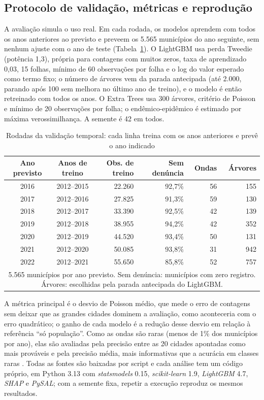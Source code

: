 \documentclass[12pt]{article}
\begin{document}
\subsection{Protocolo de validação, métricas e reprodução}

A avaliação simula o uso real. Em cada rodada, os modelos aprendem com todos os anos anteriores ao previsto e preveem os 5.565 municípios do ano seguinte, sem nenhum ajuste com o ano de teste (Tabela~\ref{tab:rodadas}). O LightGBM usa perda Tweedie (potência 1,3), própria para contagens com muitos zeros, taxa de aprendizado 0,03, 15 folhas, mínimo de 60 observações por folha e o log do valor esperado como termo fixo; o número de árvores vem da parada antecipada (até 2.000, parando após 100 sem melhora no último ano de treino), e o modelo é então retreinado com todos os anos. O Extra Trees usa 300 árvores, critério de Poisson e mínimo de 20 observações por folha; o endêmico-epidêmico é estimado por máxima verossimilhança. A semente é 42 em todos.

\begin{table}[!htb]
\centering
\caption{Rodadas da validação temporal: cada linha treina com os anos anteriores e prevê o ano indicado}
\label{tab:rodadas}
{\renewcommand{\arraystretch}{1.0}\footnotesize
\begin{tabular}{c c r r r r}
\toprule
\textbf{Ano previsto} & \textbf{Anos de treino} & \textbf{Obs. de treino} & \textbf{Sem denúncia} & \textbf{Ondas} & \textbf{Árvores} \\
\midrule
2016 & 2012--2015 & 22.260 & 92,7\% & 56 & 155 \\
2017 & 2012--2016 & 27.825 & 91,3\% & 59 & 130 \\
2018 & 2012--2017 & 33.390 & 92,5\% & 42 & 139 \\
2019 & 2012--2018 & 38.955 & 94,2\% & 42 & 352 \\
2020 & 2012--2019 & 44.520 & 93,4\% & 50 & 131 \\
2021 & 2012--2020 & 50.085 & 93,8\% & 31 & 942 \\
2022 & 2012--2021 & 55.650 & 85,8\% & 52 & 757 \\
\bottomrule
\multicolumn{6}{p{12.5cm}}{\footnotesize 5.565 municípios por ano previsto. Sem denúncia: municípios com zero registro. Árvores: escolhidas pela parada antecipada do LightGBM.}
\end{tabular}}
\end{table}

A métrica principal é o desvio de Poisson médio, que mede o erro de contagens sem deixar que as grandes cidades dominem a avaliação, como aconteceria com o erro quadrático; o ganho de cada modelo é a redução desse desvio em relação à referência ``só população''. Como as ondas são raras (menos de 1\% dos municípios por ano), elas são avaliadas pela precisão entre as 20 cidades apontadas como mais prováveis e pela precisão média, mais informativas que a acurácia em classes raras \cite{saito_rehmsmeier:2015}. Todas as fontes são baixadas por script e cada análise tem um código próprio, em Python 3.13 com \textit{statsmodels} 0.15, \textit{scikit-learn} 1.9, \textit{LightGBM} 4.7, \textit{SHAP} e \textit{PySAL}; com a semente fixa, repetir a execução reproduz os mesmos resultados.
\end{document}
